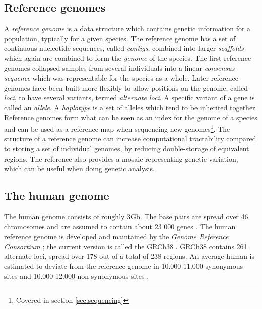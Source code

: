 \documentclass[thesis.tex]{subfiles}
\begin{document}
\subsection{Reference genomes}
A \textit{reference genome} is a data structure which contains genetic information for a population, typically for a given species. The reference genome has a set of continuous nucleotide sequences, called \textit{contigs}, combined into larger \textit{scaffolds} which again are combined to form the \textit{genome} of the species. The first reference genomes collapsed samples from several individuals into a linear \textit{consensus sequence} which was representable for the species as a whole. Later reference genomes have been built more flexibly to allow positions on the genome, called \textit{loci}, to have several variants, termed \textit{alternate loci}. A specific variant of a gene is called an \textit{allele}. A \textit{haplotype} is a set of alleles which tend to be inherited together. Reference genomes form what can be seen as an index for the genome of a species and can be used as a reference map when sequencing new genomes\footnote{Covered in section \ref{sec:sequencing}}. The structure of a reference genome can increase computational tractability compared to storing a set of individual genomes, by reducing double-storage of equivalent regions. The reference also provides a mosaic representing genetic variation, which can be useful when doing genetic analysis.\\
\par\noindent
\subsection{The human genome}
\label{sec:human_genome}
The human genome consists of roughly 3Gb. The base pairs are spread over 46 chromosomes and are assumed to contain about 23 000 genes \cite{introduction_to_genomics}. The human reference genome is developed and maintained by the \textit{Genome Reference Consortium} \cite{genome_reference_consortium}; the current version is called the GRCh38 \cite{grch38}. GRCh38 contains 261 alternate loci, spread over 178 out of a total of 238 regions. An average human is estimated to deviate from the reference genome in 10.000-11.000 synonymous sites and 10.000-12.000 non-synonymous sites \cite{a_map_of_human_genome_variation_from_population_scale_sequencing}.
\end{document}
